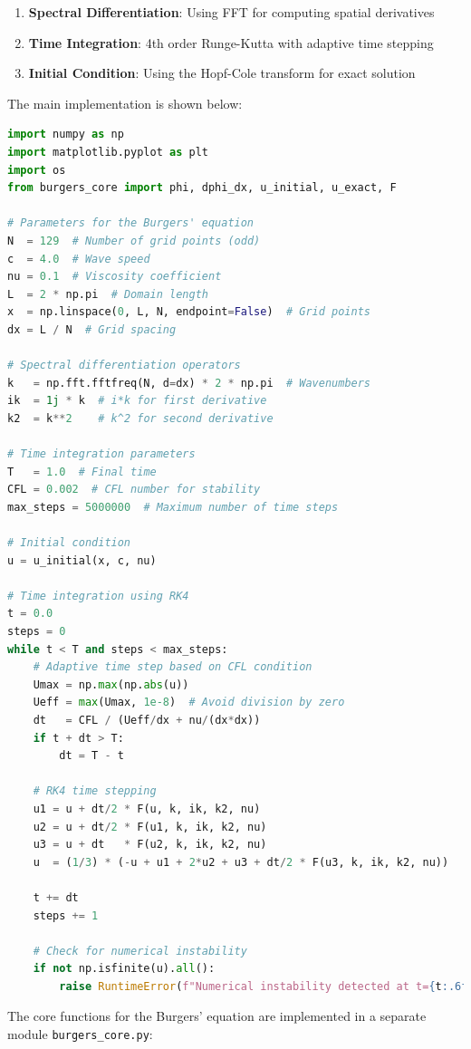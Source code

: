 \documentclass{article}
\begin{document}
\begin{enumerate}
    \item \textbf{Spectral Differentiation}: Using FFT for computing spatial derivatives
    \item \textbf{Time Integration}: 4th order Runge-Kutta with adaptive time stepping
    \item \textbf{Initial Condition}: Using the Hopf-Cole transform for exact solution
\end{enumerate}

The main implementation is shown below:

\begin{lstlisting}[language=Python]
import numpy as np
import matplotlib.pyplot as plt
import os
from burgers_core import phi, dphi_dx, u_initial, u_exact, F

# Parameters for the Burgers' equation
N  = 129  # Number of grid points (odd)
c  = 4.0  # Wave speed
nu = 0.1  # Viscosity coefficient
L  = 2 * np.pi  # Domain length
x  = np.linspace(0, L, N, endpoint=False)  # Grid points
dx = L / N  # Grid spacing

# Spectral differentiation operators
k   = np.fft.fftfreq(N, d=dx) * 2 * np.pi  # Wavenumbers
ik  = 1j * k  # i*k for first derivative
k2  = k**2    # k^2 for second derivative

# Time integration parameters
T   = 1.0  # Final time
CFL = 0.002  # CFL number for stability
max_steps = 5000000  # Maximum number of time steps

# Initial condition
u = u_initial(x, c, nu)

# Time integration using RK4
t = 0.0
steps = 0
while t < T and steps < max_steps:
    # Adaptive time step based on CFL condition
    Umax = np.max(np.abs(u))
    Ueff = max(Umax, 1e-8)  # Avoid division by zero
    dt   = CFL / (Ueff/dx + nu/(dx*dx))
    if t + dt > T:
        dt = T - t
    
    # RK4 time stepping
    u1 = u + dt/2 * F(u, k, ik, k2, nu)
    u2 = u + dt/2 * F(u1, k, ik, k2, nu)
    u3 = u + dt   * F(u2, k, ik, k2, nu)
    u  = (1/3) * (-u + u1 + 2*u2 + u3 + dt/2 * F(u3, k, ik, k2, nu))
    
    t += dt
    steps += 1
    
    # Check for numerical instability
    if not np.isfinite(u).all():
        raise RuntimeError(f"Numerical instability detected at t={t:.6f} (CFL={CFL})")
\end{lstlisting}

The core functions for the Burgers' equation are implemented in a separate module \texttt{burgers\_core.py}:
\end{document}
